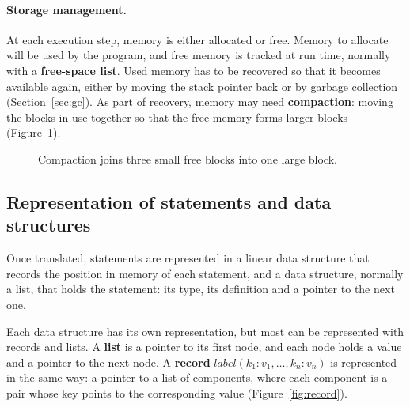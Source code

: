 \paragraph{Storage management.} At each execution step, memory is either
allocated or free. Memory to allocate will be used by the program, and free
memory is tracked at run time, normally with a \textbf{free-space list}. Used
memory has to be recovered so that it becomes available again, either by
moving the stack pointer back or by garbage collection
(Section~\ref{sec:gc}). As part of recovery, memory may need
\textbf{compaction}: moving the blocks in use together so that the free memory
forms larger blocks (Figure~\ref{fig:compaction}).

\begin{figure}[h]
\centering
{}
\caption{Compaction joins three small free blocks into one large block.}
\label{fig:compaction}
\end{figure}

\subsection{Representation of statements and data structures}

Once translated, statements are represented in a linear data structure that
records the position in memory of each statement, and a data structure,
normally a list, that holds the statement: its type, its definition and a
pointer to the next one.

Each data structure has its own representation, but most can be represented
with records and lists. A \textbf{list} is a pointer to its first node, and
each node holds a value and a pointer to the next node. A \textbf{record}
$\mathit{label}(k_1 : v_1, \dots, k_n : v_n)$ is represented in the same way: a
pointer to a list of components, where each component is a pair whose key
points to the corresponding value (Figure~\ref{fig:record}).

